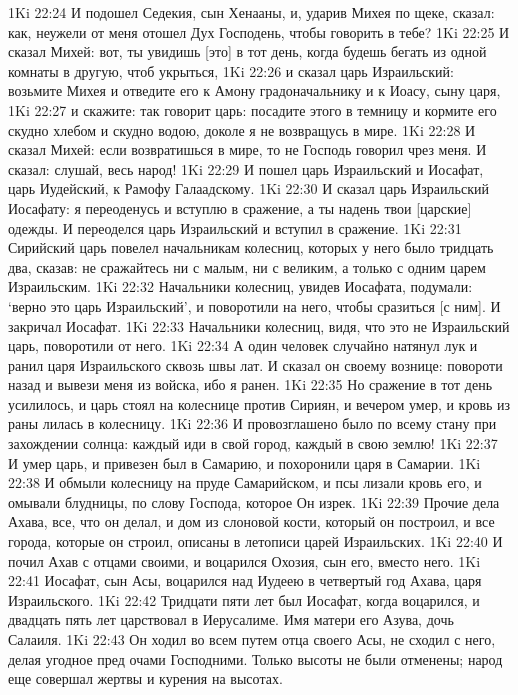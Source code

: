 1Ki 22:24  И подошел Седекия, сын Хенааны, и, ударив Михея по щеке, сказал: как, неужели от меня отошел Дух Господень, чтобы говорить в тебе?
1Ki 22:25  И сказал Михей: вот, ты увидишь [это] в тот день, когда будешь бегать из одной комнаты в другую, чтоб укрыться,
1Ki 22:26  и сказал царь Израильский: возьмите Михея и отведите его к Амону градоначальнику и к Иоасу, сыну царя,
1Ki 22:27  и скажите: так говорит царь: посадите этого в темницу и кормите его скудно хлебом и скудно водою, доколе я не возвращусь в мире.
1Ki 22:28  И сказал Михей: если возвратишься в мире, то не Господь говорил чрез меня. И сказал: слушай, весь народ!
1Ki 22:29  И пошел царь Израильский и Иосафат, царь Иудейский, к Рамофу Галаадскому.
1Ki 22:30  И сказал царь Израильский Иосафату: я переоденусь и вступлю в сражение, а ты надень твои [царские] одежды. И переоделся царь Израильский и вступил в сражение.
1Ki 22:31  Сирийский царь повелел начальникам колесниц, которых у него было тридцать два, сказав: не сражайтесь ни с малым, ни с великим, а только с одним царем Израильским.
1Ki 22:32  Начальники колесниц, увидев Иосафата, подумали: `верно это царь Израильский', и поворотили на него, чтобы сразиться [с ним]. И закричал Иосафат.
1Ki 22:33  Начальники колесниц, видя, что это не Израильский царь, поворотили от него.
1Ki 22:34  А один человек случайно натянул лук и ранил царя Израильского сквозь швы лат. И сказал он своему вознице: повороти назад и вывези меня из войска, ибо я ранен.
1Ki 22:35  Но сражение в тот день усилилось, и царь стоял на колеснице против Сириян, и вечером умер, и кровь из раны лилась в колесницу.
1Ki 22:36  И провозглашено было по всему стану при захождении солнца: каждый иди в свой город, каждый в свою землю!
1Ki 22:37  И умер царь, и привезен был в Самарию, и похоронили царя в Самарии.
1Ki 22:38  И обмыли колесницу на пруде Самарийском, и псы лизали кровь его, и омывали блудницы, по слову Господа, которое Он изрек.
1Ki 22:39  Прочие дела Ахава, все, что он делал, и дом из слоновой кости, который он построил, и все города, которые он строил, описаны в летописи царей Израильских.
1Ki 22:40  И почил Ахав с отцами своими, и воцарился Охозия, сын его, вместо него.
1Ki 22:41  Иосафат, сын Асы, воцарился над Иудеею в четвертый год Ахава, царя Израильского.
1Ki 22:42  Тридцати пяти лет был Иосафат, когда воцарился, и двадцать пять лет царствовал в Иерусалиме. Имя матери его Азува, дочь Салаиля.
1Ki 22:43  Он ходил во всем путем отца своего Асы, не сходил с него, делая угодное пред очами Господними. Только высоты не были отменены; народ еще совершал жертвы и курения на высотах.
